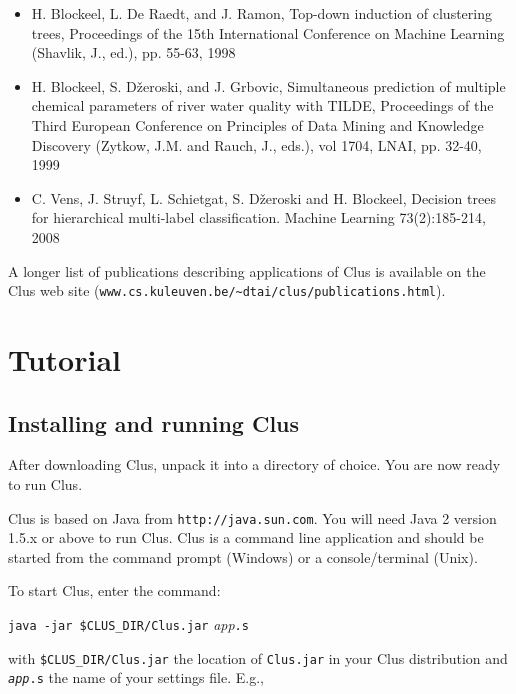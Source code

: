 \begin{itemize}

\item H. Blockeel, L. De Raedt, and J. Ramon, Top-down induction of clustering trees, Proceedings of the 15th International Conference on Machine Learning (Shavlik, J., ed.), pp. 55-63, 1998

\item H. Blockeel, S. D\v zeroski, and J. Grbovic, Simultaneous prediction of multiple chemical parameters of river water quality with TILDE, Proceedings of the Third European Conference on Principles of Data Mining and Knowledge Discovery (Zytkow, J.M. and Rauch, J., eds.), vol 1704, LNAI, pp. 32-40, 1999

\item  C. Vens, J. Struyf, L. Schietgat, S. D\v zeroski and H. Blockeel, Decision trees for hierarchical multi-label classification. Machine Learning 73(2):185-214, 2008

\end{itemize}

A longer list of publications describing applications of Clus is available on the Clus web site
(\verb^www.cs.kuleuven.be/~dtai/clus/publications.html^).

\chapter{Tutorial}

\section{Installing and running Clus}

After downloading Clus, unpack it into a directory of choice.
You are now ready to run Clus.

Clus is based on Java from {\tt http://java.sun.com}. You will need 
Java 2 version 1.5.x or above to run Clus. Clus is a command line 
application and should be started from the command prompt
(Windows) or a console/terminal (Unix).

To start Clus, enter the command:
\begin{flushleft}
\verb^java -jar $CLUS_DIR/Clus.jar^ {\em app}\verb^.s^
\end{flushleft}

with \verb^$CLUS_DIR/Clus.jar^ the location of \verb^Clus.jar^ in your Clus 
distribution and {\tt {\em app}.s} the name of your settings file. E.g.,

